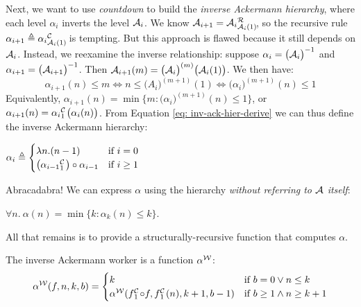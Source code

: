 Next, we want to use \emph{countdown} to build the \emph{inverse Ackermann hierarchy}, where each
level $\alpha_i$ inverts the level $\mathcal{A}_i$.
We know $\Ack_{i+1} = \rf{\Ack_i}{\Ack_i(1)}$, so the recursive
rule $\alpha_{i+1} \triangleq \cdt{\alpha_i}{\Ack_i(1)}$ is tempting.
But this approach is flawed because it still depends on $\mathcal{A}_i$.
Instead, we reexamine the inverse relationship: suppose $\alpha_i = \big(\mathcal{A}_i\big)^{-1}$ and $\alpha_{i+1} = \big(\mathcal{A}_{i+1}\big)^{-1}$. Then $\mathcal{A}_{i+1}(m) = \big(\mathcal{A}_{i}\big)^{(m)} \big(\mathcal{A}_{i}(1)\big)$. We then have:
\begin{equation} \label{eq: inv-ack-hier-derive}
\alpha_{i+1}(n)\le m \iff n\le \big(A_i\big)^{(m+1)}(1) \iff \big(\alpha_i\big)^{(m+1)}(n) \le 1
\end{equation}
Equivalently, $\alpha_{i+1}(n) = \min\big\{m : \big( \alpha_i \big)^{(m+1)}(n)\le 1\big\}$, or $\alpha_{i+1}(n) = \cdt{\alpha_i}{1}\big(\alpha_i(n)\big)$. From Equation \ref{eq: inv-ack-hier-derive} we can thus define the inverse Ackermann hierarchy:
\begin{defn} \label{defn: inv-ack-hier}
	$ \alpha_i \triangleq \begin{cases}
	\lambda n.(n - 1) & \text{if } i = 0
	\\ \big(\cdt{\alpha_{i-1}}{1}\big)\circ \alpha_{i-1} & \text{if } i\ge 1 \end{cases}
$
\end{defn}
Abracadabra! We can express $\alpha$ using the hierarchy \emph{without referring to $\mathcal{A}$ itself}:
\begin{thm} \label{thm: inv-ack-new}
	$\forall n.~ \alpha(n) = \min\big\{k : \alpha_k(n)\le k \big\}$.
\end{thm}
All that remains is to provide a structurally-recursive function that computes $\alpha$.
\begin{defn} \label{defn: inv-ack-worker}
	The inverse Ackermann worker is a function $\alpha^{\mathcal{W}}$: %
	\begin{equation} \label{eq: inv-ack-worker-recursion}
	\alpha^{\W}(f, n, k, b) = \begin{cases}
	k & \text{if } b = 0 \vee n\le k \\ \alpha^{\W}(\cdt{f}{1}\circ f , \cdt{f}{1}(n), k+1, b-1) & \text{if } b \ge 1 \wedge n \ge k+1
	\end{cases}
	\end{equation}
\end{defn}
